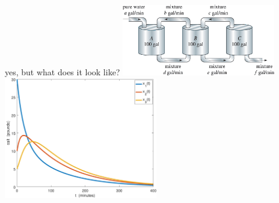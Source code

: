 \documentclass[urlcolor=blue,dvipsnames]{beamer}
\begin{document}
\begin{frame}{yes, but what does it look like?}
\vspace{-15mm}
\mbox{\includegraphics[width=0.5\textwidth]{figs/three-tanks}\quad \includegraphics[width=0.5\textwidth]{figs/brines-xvt}}
\end{frame}
\end{document}
